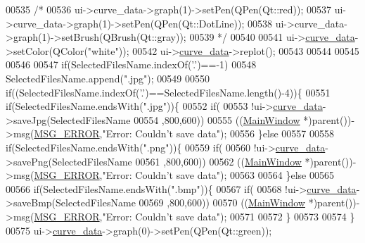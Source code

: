 \begin{DoxyCode}
00535     \textcolor{comment}{/*}
00536 \textcolor{comment}{    ui->curve\_data->graph(1)->setPen(QPen(Qt::red));}
00537 \textcolor{comment}{    ui->curve\_data->graph(1)->setPen(QPen(Qt::DotLine));}
00538 \textcolor{comment}{    ui->curve\_data->graph(1)->setBrush(QBrush(Qt::gray));}
00539 \textcolor{comment}{    */}
00540 
00541     ui->\hyperlink{a00028_a247d94481323c0bc4f8b6458a8a535dd}{curve\_data}->setColor(QColor(\textcolor{stringliteral}{"white"}));
00542     ui->\hyperlink{a00028_a247d94481323c0bc4f8b6458a8a535dd}{curve\_data}->replot();
00543 
00544 
00545 
00546 
00547     \textcolor{keywordflow}{if}(SelectedFilesName.indexOf(\textcolor{charliteral}{'.'})==-1)
00548         SelectedFilesName.append(\textcolor{stringliteral}{".jpg"});
00549 
00550     \textcolor{keywordflow}{if}((SelectedFilesName.indexOf(\textcolor{charliteral}{'.'})==SelectedFilesName.length()-4))\{
00551     \textcolor{keywordflow}{if}(SelectedFilesName.endsWith(\textcolor{stringliteral}{".jpg"}))\{
00552        \textcolor{keywordflow}{if}(
00553         !ui->\hyperlink{a00028_a247d94481323c0bc4f8b6458a8a535dd}{curve\_data}->saveJpg(SelectedFilesName
00554                                 ,800,600))
00555             ((\hyperlink{a00006}{MainWindow} *)parent())->msg(\hyperlink{a00034_aa8a990825a5a62c89d2fb8b08d8a1070}{MSG\_ERROR},\textcolor{stringliteral}{"Error: Couldn't save data"});
00556     \}\textcolor{keywordflow}{else}
00557 
00558     \textcolor{keywordflow}{if}(SelectedFilesName.endsWith(\textcolor{stringliteral}{".png"}))\{
00559            \textcolor{keywordflow}{if}(
00560             !ui->\hyperlink{a00028_a247d94481323c0bc4f8b6458a8a535dd}{curve\_data}->savePng(SelectedFilesName
00561                                     ,800,600))
00562                 ((\hyperlink{a00006}{MainWindow} *)parent())->msg(\hyperlink{a00034_aa8a990825a5a62c89d2fb8b08d8a1070}{MSG\_ERROR},\textcolor{stringliteral}{"Error: Couldn't save data"});
00563 
00564     \}\textcolor{keywordflow}{else}
00565 
00566     \textcolor{keywordflow}{if}(SelectedFilesName.endsWith(\textcolor{stringliteral}{".bmp"}))\{
00567                   \textcolor{keywordflow}{if}(
00568                    !ui->\hyperlink{a00028_a247d94481323c0bc4f8b6458a8a535dd}{curve\_data}->saveBmp(SelectedFilesName
00569                                            ,800,600))
00570                        ((\hyperlink{a00006}{MainWindow} *)parent())->msg(\hyperlink{a00034_aa8a990825a5a62c89d2fb8b08d8a1070}{MSG\_ERROR},\textcolor{stringliteral}{"Error: Couldn't save
       data"});
00571 
00572      \}
00573 
00574     \}
00575      ui->\hyperlink{a00028_a247d94481323c0bc4f8b6458a8a535dd}{curve\_data}->graph(0)->setPen(QPen(Qt::green));

\end{DoxyCode}
